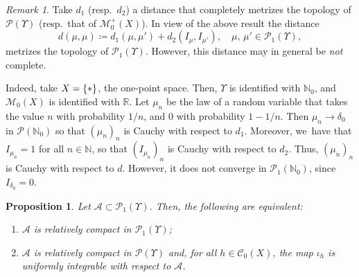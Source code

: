 \documentclass[JEP,XML,SOM,Unicode,published]{cedram}
\newtheorem{proposition}[theorem]{Proposition}
\theoremstyle{definition}
\theoremstyle{remark}
\newtheorem{remark}[theorem]{Remark}
\DeclarePairedDelimiter{\set}{\lbrace}{\rbrace}
\begin{document}
\begin{remark}
Take $d_{1}$ (resp.\ $d_{2}$) a distance that completely metrizes the topology of $\mathscr{P}(\varUpsilon)$ (resp.\ that of $\mathscr{M}^{+}_{0}(X)$).
In view of the above result the distance
\begin{equation*}
d(\mu, \mu) \coloneq d_{1}(\mu, \mu') + d_{2}(I_{\mu}, I_{\mu'}), \quad \mu,\, \mu' \in \mathscr{P}_{1}(\varUpsilon),
\end{equation*}
metrizes the topology of $\mathscr{P}_{1}(\varUpsilon)$.
However, this distance may in general be \emph{not} complete.

Indeed, take $X = \set{ \ast }$, the one-point space.
Then, $\varUpsilon$ is identified with $\mathbb{N}_0$, and $\mathscr{M}_{0}(X)$ is identified with $\mathbb{R}$.
Let $\mu_{n}$ be the law of a random variable that takes the value $n$ with probability $1/n$, and $0$ with probability $1 -1/n$.
Then $\mu_{n} \to \delta_{0}$ in $\mathscr{P}(\mathbb{N}_0)$ so that $(\mu_{n})_n$ is Cauchy with respect to $d_{1}$.
Moreover, we~have that $I_{\mu_{n}} = 1$ for all $n \in \mathbb{N}$, so that $(I_{\mu_{n}})_n$ is Cauchy with respect to $d_{2}$.
Thus, $(\mu_{n})_n$ is Cauchy with respect to $d$.
However, it does not converge in $\mathscr{P}_{1}(\mathbb{N}_0)$, since $I_{\delta_0}=0$.
\end{remark}

\begin{proposition}\label{t:p1-compactness}
Let $\mathscr{A} \subset \mathscr{P}_{1}(\varUpsilon)$.
Then, the following are equivalent:
\begin{enumerate}[$(\rm i)$,wide]
\item\label{i:compact-p1} $\mathscr{A}$ is relatively compact in $\mathscr{P}_{1}(\varUpsilon)$;
\item\label{i:ui} $\mathscr{A}$ is relatively compact in $\mathscr{P}(\varUpsilon)$ and, for all $h \in \mathscr{C}_{0}(X)$, the map $\iota_{h}$ is uniformly integrable with respect to $\mathscr{A}$.
\end{enumerate}
\end{proposition}
\end{document}
